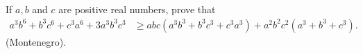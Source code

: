 If ${a, b}$ and $c$ are positive real numbers, prove that\begin{align*}

 a ^ 3b ^ 6 + b ^ 3c ^ 6 + c ^ 3a ^ 6 + 3a ^ 3b ^ 3c ^ 3 &\ge{ abc \left (a ^ 3b ^ 3 + b ^ 3c ^ 3 + c ^ 3a ^ 3 \right) + a ^ 2b ^ 2c ^ 2 \left (a ^ 3 + b ^ 3 + c ^ 3 \right)}.

\end{align*}(Montenegro).